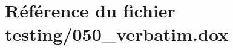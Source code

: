 \hypertarget{050__verbatim_8dox}{}\section{Référence du fichier testing/050\+\_\+verbatim.dox}
\label{050__verbatim_8dox}
